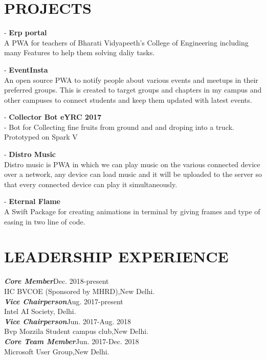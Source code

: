 \documentclass[margin, 10pt]{res}
\begin{document}
\begin{resume}
    
      \newpage

    
    
    \section{PROJECTS}
    - {\bf Erp portal }\\
    A PWA for teachers of Bharati Vidyapeeth's College of Engineering including many Features to help them solving daliy tasks.
    
    - {\bf EventInsta }\\
    An open source PWA to notify people about various events and meetups in their preferred groups. This is created to target groups and chapters in my campus and other campuses to connect students and keep them updated with latest events.  
    
    - {\bf Collector Bot eYRC 2017} \\
    - Bot for Collecting  fine fruits from ground and and droping into a truck. Prototyped on Spark V 
    
    - {\bf Distro Music} \\ Distro music is PWA in which we can play music on the various connected device over a network, any device can load music and it will be uploaded to the server so that  every connected device can play it simultaneously. 
    
    - {\bf Eternal Flame}\\
    A Swift Package for creating animations in terminal by giving frames and type of easing in two line of code.
    
    
    \section{LEADERSHIP EXPERIENCE}
    {\sl {\bf Core  Member}}\hfill Dec. 2018-present \\
    IIC BVCOE (Sponsored by MHRD),New Delhi.\\ 
    {\sl {\bf Vice Chairperson}}\hfill Aug. 2017-present \\
     Intel AI Society, Delhi.\\
    {\sl {\bf Vice Chairperson}}\hfill Jun. 2017-Aug. 2018 \\
     Bvp Mozzila Student campus club,New Delhi.\\ 
    {\sl {\bf Core Team Member}}\hfill Jun. 2017-Dec. 2018 \\
     Microsoft User Group,New Delhi.\\ 
    


\end{resume}
\end{document}
